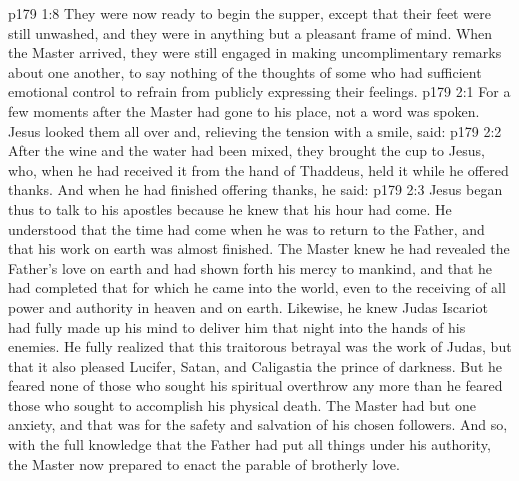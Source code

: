 \vs p179 1:8 They were now ready to begin the supper, except that their feet were still unwashed, and they were in anything but a pleasant frame of mind. When the Master arrived, they were still engaged in making uncomplimentary remarks about one another, to say nothing of the thoughts of some who had sufficient emotional control to refrain from publicly expressing their feelings.
\vs p179 2:1 For a few moments after the Master had gone to his place, not a word was spoken. Jesus looked them all over and, relieving the tension with a smile, said: 
\vs p179 2:2 After the wine and the water had been mixed, they brought the cup to Jesus, who, when he had received it from the hand of Thaddeus, held it while he offered thanks. And when he had finished offering thanks, he said: 
\vs p179 2:3 Jesus began thus to talk to his apostles because he knew that his hour had come. He understood that the time had come when he was to return to the Father, and that his work on earth was almost finished. The Master knew he had revealed the Father’s love on earth and had shown forth his mercy to mankind, and that he had completed that for which he came into the world, even to the receiving of all power and authority in heaven and on earth. Likewise, he knew Judas Iscariot had fully made up his mind to deliver him that night into the hands of his enemies. He fully realized that this traitorous betrayal was the work of Judas, but that it also pleased Lucifer, Satan, and Caligastia the prince of darkness. But he feared none of those who sought his spiritual overthrow any more than he feared those who sought to accomplish his physical death. The Master had but one anxiety, and that was for the safety and salvation of his chosen followers. And so, with the full knowledge that the Father had put all things under his authority, the Master now prepared to enact the parable of brotherly love.

